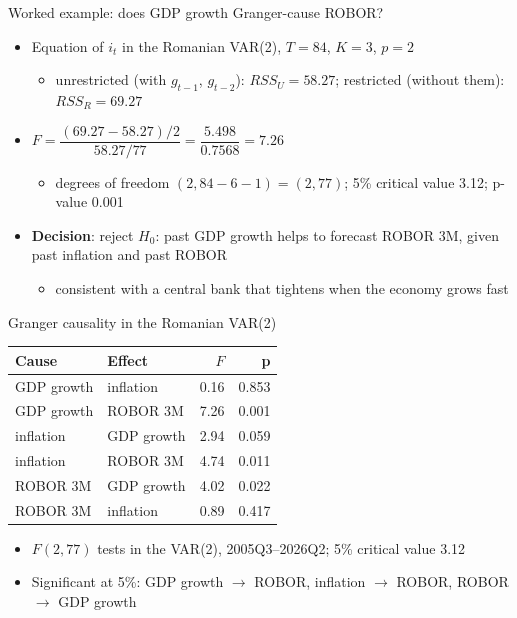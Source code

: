 \begin{frame}{Worked example: does GDP growth Granger-cause ROBOR?}
\itemsize{\small}
\begin{itemize}
    \item Equation of $i_t$ in the Romanian VAR(2), $T = 84$, $K = 3$, $p = 2$
    \begin{itemize}
        \item unrestricted (with $g_{t-1}$, $g_{t-2}$): $RSS_U = 58.27$; restricted (without them): $RSS_R = 69.27$
    \end{itemize}
    \item $F = \dfrac{(69.27 - 58.27)/2}{58.27/77} = \dfrac{5.498}{0.7568} = 7.26$
    \begin{itemize}
        \item degrees of freedom $(2, 84 - 6 - 1) = (2, 77)$; 5\% critical value 3.12; p-value 0.001
    \end{itemize}
    \item \textbf{Decision}: reject $H_0$: past GDP growth helps to forecast ROBOR 3M, given past inflation and past ROBOR
    \begin{itemize}
        \item consistent with a central bank that tightens when the economy grows fast
    \end{itemize}
\end{itemize}
\end{frame}

\begin{frame}{Granger causality in the Romanian VAR(2)}
\itemsize{\small}
\begin{center}
\footnotesize
\begin{tabular}{llrr}
\toprule
\textbf{Cause} & \textbf{Effect} & $F$ & \textbf{p} \\
\midrule
GDP growth & inflation & 0.16 & 0.853 \\
GDP growth & ROBOR 3M & 7.26 & 0.001 \\
inflation & GDP growth & 2.94 & 0.059 \\
inflation & ROBOR 3M & 4.74 & 0.011 \\
ROBOR 3M & GDP growth & 4.02 & 0.022 \\
ROBOR 3M & inflation & 0.89 & 0.417 \\
\bottomrule
\end{tabular}
\end{center}
\begin{itemize}
    \item $F(2, 77)$ tests in the VAR(2), 2005Q3--2026Q2; 5\% critical value 3.12
    \item Significant at 5\%: GDP growth $\to$ ROBOR, inflation $\to$ ROBOR, ROBOR $\to$ GDP growth
\end{itemize}
\end{frame}

